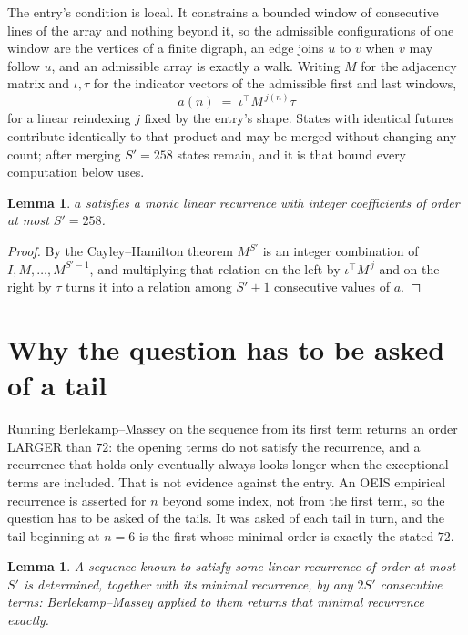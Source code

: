 \documentclass[11pt,a4paper]{article}
\theoremstyle{plain}
\newtheorem{lemma}[theorem]{Lemma}
\theoremstyle{definition}
\begin{document}
The entry's condition is local. It constrains a bounded window of consecutive lines of the
array and nothing beyond it, so the admissible configurations of one window are the vertices of
a finite digraph, an edge joins $u$ to $v$ when $v$ may follow $u$, and an admissible array is
exactly a walk. Writing $M$ for the adjacency matrix and $\iota,\tau$ for the indicator vectors
of the admissible first and last windows,
\[
a(n)\;=\;\iota^{\!\top}M^{\,j(n)}\tau
\]
for a linear reindexing $j$ fixed by the entry's shape. States with identical futures
contribute identically to that product and may be merged without changing any count; after
merging $S'=258$ states remain, and it is that bound every computation below uses.

\begin{lemma}\label{lem:cf}
$a$ satisfies a monic linear recurrence with integer coefficients of order at most $S'=258$.
\end{lemma}

\begin{proof}
By the Cayley--Hamilton theorem $M^{S'}$ is an integer combination of $I,M,\dots,M^{S'-1}$,
and multiplying that relation on the left by $\iota^{\!\top}M^{\,j}$ and on the right by
$\tau$ turns it into a relation among $S'+1$ consecutive values of $a$.
\end{proof}

\section{Why the question has to be asked of a tail}

Running Berlekamp--Massey on the sequence from its first term returns an order LARGER than $72$: the opening terms do not satisfy the recurrence, and a recurrence that holds only eventually always looks longer when the exceptional terms are included. That is not evidence against the entry. An OEIS empirical recurrence is asserted for $n$ beyond some index, not from the first term, so the question has to be asked of the tails. It was asked of each tail in turn, and the tail beginning at $n=6$ is the first whose minimal order is exactly the stated $72$.

\begin{lemma}\label{lem:bm}
A sequence known to satisfy some linear recurrence of order at most $S'$ is determined,
together with its minimal recurrence, by any $2S'$ consecutive terms: Berlekamp--Massey applied
to them returns that minimal recurrence exactly.
\end{lemma}
\end{document}
